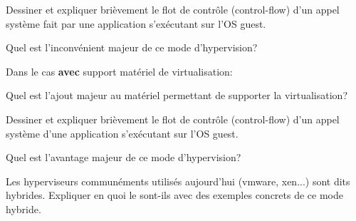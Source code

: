\begin{questions}
\begin{parts}
\begin{subparts}
\begin{subsubparts}
        \subsubpart[2] Dessiner et expliquer brièvement le flot de contrôle (control-flow) d'un appel système fait par une application s'exécutant sur l'OS guest.

        \subsubpart[1] Quel est l'inconvénient majeur de ce mode d'hypervision?
      \end{subsubparts}

      \subpart Dans le cas \textbf{avec} support matériel de virtualisation:
      \begin{subsubparts}
        \subsubpart[1] Quel est l'ajout majeur au matériel permettant de supporter la virtualisation?

        \subsubpart[2] Dessiner et expliquer brièvement le flot de contrôle (control-flow) d'un appel système d'une application s'exécutant sur l'OS guest.

        \subsubpart[1] Quel est l'avantage majeur de ce mode d'hypervision?

      \end{subsubparts}
  \end{subparts}

  \bonuspart[1] Les hyperviseurs communéments utilisés aujourd'hui (vmware, xen...) sont dits hybrides. Expliquer en quoi le sont-ils avec des exemples concrets de ce mode hybride.

\end{parts}

\end{questions}

%
%
\gradingtable


